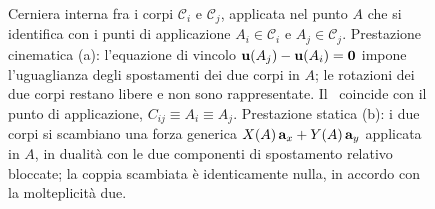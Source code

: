 \begin{figure}[htbp]
	\caption[Cerniera interna fra due corpi: prestazioni cinematica e statica.]{%
		Cerniera interna fra i corpi $\mathcal{C}_i$ e
		$\mathcal{C}_j$, applicata nel punto $A$ che si identifica
		con i punti di applicazione $A_i \in \mathcal{C}_i$ e
		$A_j \in \mathcal{C}_j$. Prestazione cinematica (a):
		l'equazione di vincolo $\mathbf{u}(A_j) - \mathbf{u}(A_i) = \mathbf{0}$
		impone l'uguaglianza degli spostamenti dei due corpi in
		$A$; le rotazioni dei due corpi restano libere e non sono
		rappresentate. Il \CRr\ coincide con il punto di
		applicazione, $C_{ij} \equiv A_i \equiv A_j$.
		Prestazione statica (b): i due corpi si scambiano una
		forza generica $X(A)\,\mathbf{a}_x + Y(A)\,\mathbf{a}_y$ applicata in
		$A$, in dualità con le due componenti di spostamento
		relativo bloccate; la coppia scambiata è identicamente
		nulla, in accordo con la molteplicità due.}
	\label{fig:cerniera_interna}
\end{figure}
